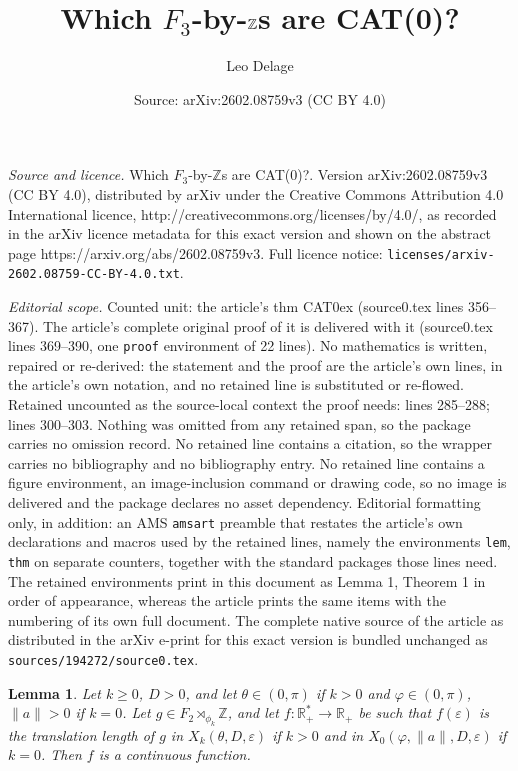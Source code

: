 \documentclass[10pt,a4paper]{amsart}
\title{Which $F_3$-by-$\Z$s are CAT(0)?}
\author{Leo Delage}
\date{Source: arXiv:2602.08759v3 (CC BY 4.0)}
\newtheorem{lem}{Lemma}
\newcommand{\R}{\mathbb{R}}
\newcommand{\Z}{\mathbb{Z}}
\newcommand{\eps}{\varepsilon}
\begin{document}
\maketitle

\noindent\emph{Source and licence.} Which $F_3$-by-$\Z$s are CAT(0)?. Version arXiv:2602.08759v3 (CC BY 4.0), distributed by arXiv under the Creative Commons Attribution 4.0 International licence, http://creativecommons.org/licenses/by/4.0/, as recorded in the arXiv licence metadata for this exact version and shown on the abstract page https://arxiv.org/abs/2602.08759v3. Full licence notice: \texttt{licenses/arxiv-2602.08759-CC-BY-4.0.txt}.\par\smallskip

\noindent\textit{Editorial scope.} Counted unit: the article's thm CAT0ex (source0.tex lines 356--367). The article's complete original proof of it is delivered with it (source0.tex lines 369--390, one \texttt{proof} environment of 22 lines). No mathematics is written, repaired or re-derived: the statement and the proof are the article's own lines, in the article's own notation, and no retained line is substituted or re-flowed.  Retained uncounted as the source-local context the proof needs: lines 285--288; lines 300--303.  Nothing was omitted from any retained span, so the package carries no omission record.  No retained line contains a citation, so the wrapper carries no bibliography and no bibliography entry.  No retained line contains a figure environment, an image-inclusion command or drawing code, so no image is delivered and the package declares no asset dependency.  Editorial formatting only, in addition: an AMS \texttt{amsart} preamble that restates the article's own declarations and macros used by the retained lines, namely the environments \texttt{lem}, \texttt{thm} on separate counters, together with the standard packages those lines need.  The retained environments print in this document as Lemma 1, Theorem 1 in order of appearance, whereas the article prints the same items with the numbering of its own full document.  The complete native source of the article as distributed in the arXiv e-print for this exact version is bundled unchanged as \texttt{sources/194272/source0.tex}.
\begin{lem}
\label{Cont}
    Let $k\ge 0$, $D > 0$, and let $\theta\in (0, \pi)$ if $k > 0$ and $\varphi\in (0, \pi)$, $\|a\| > 0$ if $k = 0$. Let $g\in F_2\rtimes_{\phi_k}\Z$, and let $f: \R_+^* \longrightarrow \R_+$ be such that $f(\eps)$ is the translation length of $g$ in $X_k(\theta, D, \eps)$ if $k>0$ and in $X_0(\varphi, \|a\|, D, \eps)$ if $k=0$. Then $f$ is a continuous function.
\end{lem}
\end{document}
